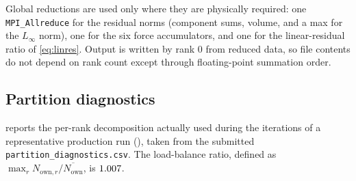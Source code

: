 Global reductions are used only where they are physically required: one
\texttt{MPI\_Allreduce} for the residual norms (component sums, volume, and a max
for the $L_\infty$ norm), one for the six force accumulators, and one for the
linear-residual ratio of \cref{eq:linres}. Output is written by rank 0 from
reduced data, so file contents do not depend on rank count except through
floating-point summation order.

\subsection{Partition diagnostics}

 reports the per-rank decomposition actually used during the
iterations of a representative production run (\cnsPartitionCase), taken from the
submitted \texttt{partition\_diagnostics.csv}. The load-balance ratio, defined as
$\max_r N_{\mathrm{own},r}/\overline{N_{\mathrm{own}}}$, is
$\num{1.007}$.

\begin{table}[htbp]
  \centering
  \caption{Per-rank partition diagnostics for \cnsPartitionCase{}, from the
  submitted \texttt{partition\_diagnostics.csv}. Send and receive counts are the
  number of cell records moved per halo exchange.}
  \label{tab:partition}
  \small
  
\end{table}
